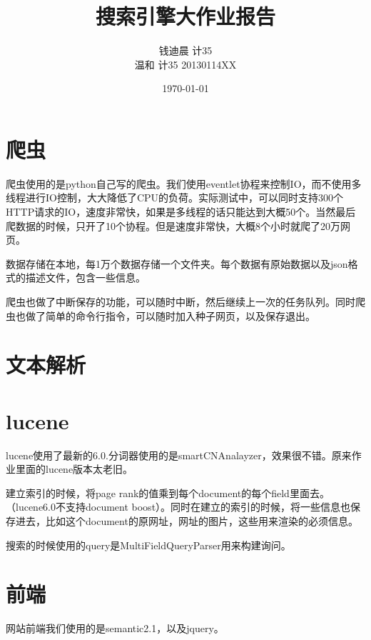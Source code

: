 \documentclass[11pt, a4paper]{article}
\title{\textbf{搜索引擎大作业报告}}
\author{
    \kai 钱迪晨 \quad 计35 \quad 2013011402 \\
    \kai 温和 \quad 计35 \quad 20130114XX
}
\date{\kai\today}
\begin{document}

\maketitle

\section{爬虫}
爬虫使用的是python自己写的爬虫。我们使用eventlet协程来控制IO，而不使用多线程进行IO控制，大大降低了CPU的负荷。实际测试中，可以同时支持300个HTTP请求的IO，速度非常快，如果是多线程的话只能达到大概50个。当然最后爬数据的时候，只开了10个协程。但是速度非常快，大概8个小时就爬了20万网页。

数据存储在本地，每1万个数据存储一个文件夹。每个数据有原始数据以及json格式的描述文件，包含一些信息。

爬虫也做了中断保存的功能，可以随时中断，然后继续上一次的任务队列。同时爬虫也做了简单的命令行指令，可以随时加入种子网页，以及保存退出。

\section{文本解析}

\section{lucene}
lucene使用了最新的6.0.分词器使用的是smartCNAnalayzer，效果很不错。原来作业里面的lucene版本太老旧。

建立索引的时候，将page rank的值乘到每个document的每个field里面去。（lucene6.0不支持document boost）。同时在建立的索引的时候，将一些信息也保存进去，比如这个document的原网址，网址的图片，这些用来渲染的必须信息。

搜索的时候使用的query是MultiFieldQueryParser用来构建询问。

\section{前端}
网站前端我们使用的是semantic2.1，以及jquery。
\end{document}
